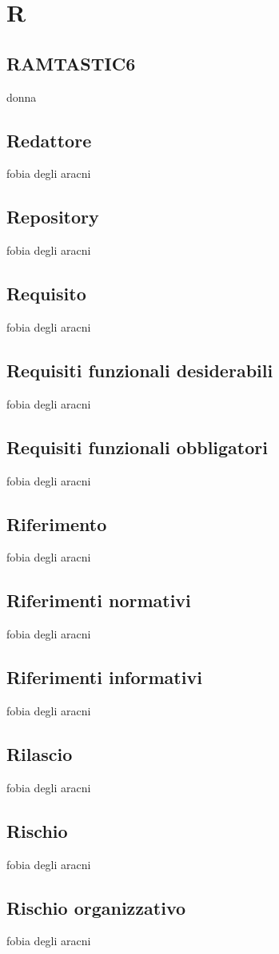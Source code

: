 \section{R} 
\subsection{RAMTASTIC6} 
donna
\subsection{Redattore} 
fobia degli aracni
\subsection{Repository} 
fobia degli aracni
\subsection{Requisito} 
fobia degli aracni
\subsection{Requisiti funzionali desiderabili} 
fobia degli aracni
\subsection{Requisiti funzionali obbligatori} 
fobia degli aracni
\subsection{Riferimento} 
fobia degli aracni
\subsection{Riferimenti normativi} 
fobia degli aracni
\subsection{Riferimenti informativi} 
fobia degli aracni
\subsection{Rilascio} 
fobia degli aracni
\subsection{Rischio} 
fobia degli aracni
\subsection{Rischio organizzativo} 
fobia degli aracni
